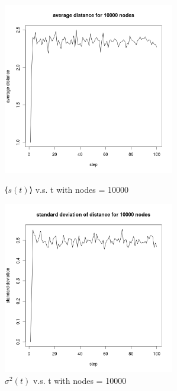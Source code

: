 \documentclass[draftcls,12pt,onecolumn]{IEEEtran}
\begin{document}
\begin{figure}[htbp]
\centering
\begin{minipage}[t]{0.48\textwidth}
\centering
\includegraphics[width=7.5cm]{2_1_d_10000_distance.png}
\caption{⟨$s(t)$⟩ v.s. t with nodes = 10000}
\label{fig07}
\end{minipage}
\begin{minipage}[t]{0.48\textwidth}
\centering
\includegraphics[width=7.5cm]{2_1_d_10000_deviation.png}
\caption{$\sigma^2(t)$ v.s. t with nodes = 10000}
\label{fig08}
\end{minipage}
\end{figure}
\end{document}
